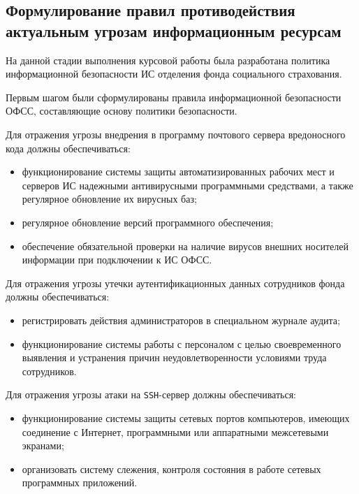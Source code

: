 \subsection{Формулирование правил противодействия
  актуальным угрозам информационным ресурсам}

\point На данной стадии выполнения курсовой работы была разработана
политика информационной безопасности ИС отделения фонда социального
страхования.

Первым шагом были сформулированы правила информационной безопасности
ОФСС, составляющие основу политики безопасности.

\point Для отражения угрозы внедрения в программу почтового сервера
вредоносного кода должны обеспечиваться:

\begin{itemize}
\item функционирование системы защиты автоматизированных рабочих мест
  и серверов ИС надежными антивирусными программными средствами, а
  также регулярное обновление их вирусных баз;
\item регулярное обновление версий программного обеспечения;
\item обеспечение обязательной проверки на наличие вирусов внешних
  носителей информации при подключении к ИС ОФСС.
\end{itemize}

\point Для отражения угрозы утечки аутентификационных данных
сотрудников фонда должны обеспечиваться:

\begin{itemize}
\item регистрировать действия администраторов в специальном журнале
  аудита;
\item функционирование системы работы с персоналом с целью
  своевременного выявления и устранения причин неудовлетворенности
  условиями труда сотрудников.
\end{itemize}

\point Для отражения угрозы атаки на \texttt{SSH}-сервер должны
обеспечиваться:

\begin{itemize}
\item функционирование системы защиты сетевых портов компьютеров,
  имеющих соединение с Интернет, программными или аппаратными
  межсетевыми экранами;
\item организовать систему слежения, контроля состояния в работе
  сетевых программных приложений.
\end{itemize}

